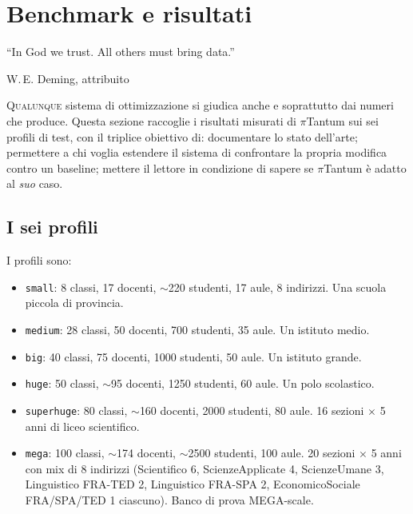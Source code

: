 \chapter{Benchmark e risultati}
\label{ch:benchmarks}


\epigraph{``In God we trust. All others must bring data.''}{W.\,E.
Deming, attribuito}

\lettrine[lines=3]{Q}{ualunque} sistema di ottimizzazione si
giudica anche e soprattutto dai numeri che produce. Questa
sezione raccoglie i risultati misurati di $\pi$Tantum sui
sei profili di test, con il triplice obiettivo di:
documentare lo stato dell'arte; permettere a chi voglia
estendere il sistema di confrontare la propria modifica
contro un baseline; mettere il lettore in condizione di
sapere se $\pi$Tantum \`e adatto al \emph{suo} caso.

\section{I sei profili}


I profili sono:

\begin{itemize}
\item \texttt{small}: 8 classi, 17 docenti, $\sim$220 studenti,
  17 aule, 8 indirizzi. Una scuola piccola di provincia.
\item \texttt{medium}: 28 classi, 50 docenti, 700 studenti,
  35 aule. Un istituto medio.
\item \texttt{big}: 40 classi, 75 docenti, 1000 studenti,
  50 aule. Un istituto grande.
\item \texttt{huge}: 50 classi, $\sim$95 docenti, 1250 studenti,
  60 aule. Un polo scolastico.
\item \texttt{superhuge}: 80 classi, $\sim$160 docenti, 2000
  studenti, 80 aule. 16 sezioni $\times$ 5 anni di liceo
  scientifico.
\item \texttt{mega}: 100 classi, $\sim$174 docenti, $\sim$2500
  studenti, 100 aule. 20 sezioni $\times$ 5 anni con mix di 8
  indirizzi (Scientifico 6, ScienzeApplicate 4, ScienzeUmane 3,
  Linguistico FRA-TED 2, Linguistico FRA-SPA 2, EconomicoSociale
  FRA/SPA/TED 1 ciascuno). Banco di prova MEGA-scale.
\end{itemize}

